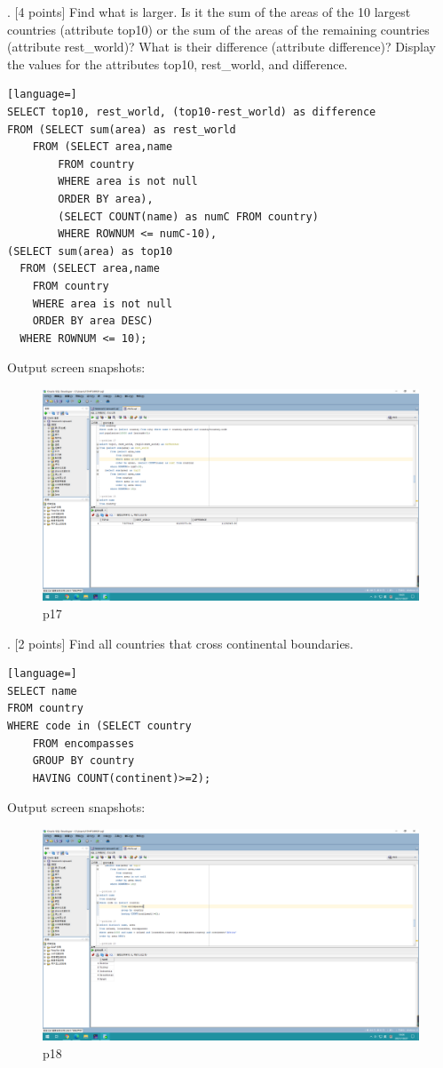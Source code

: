\documentclass[]{article}
\begin{document}
	. [4 points] Find what is larger. Is it the sum of the areas of the 10 largest countries (attribute top10) or the sum of the areas of the remaining countries (attribute rest\_world)? What is their difference (attribute difference)? Display the values for the attributes top10, rest\_world, and difference.    \\
	
	\begin{lstlisting}[language=] 
SELECT top10, rest_world, (top10-rest_world) as difference
FROM (SELECT sum(area) as rest_world
	FROM (SELECT area,name 
		FROM country
		WHERE area is not null
		ORDER BY area), 
	    (SELECT COUNT(name) as numC FROM country)
        WHERE ROWNUM <= numC-10),
(SELECT sum(area) as top10
  FROM (SELECT area,name 
	FROM country
	WHERE area is not null
	ORDER BY area DESC)
  WHERE ROWNUM <= 10);
	\end{lstlisting} 
	Output screen snapshots:
	\begin{figure}[H]
		\centering
		\includegraphics[width=1\linewidth]{../screen/p17}
		\caption{p17}
		\label{fig:p17}
	\end{figure}
	
	. [2 points] Find all countries that cross continental boundaries.   \\
	
	\begin{lstlisting}[language=] 
SELECT name
FROM country
WHERE code in (SELECT country
	FROM encompasses
	GROUP BY country
	HAVING COUNT(continent)>=2);
	\end{lstlisting} 
	Output screen snapshots:
	\begin{figure}[H]
		\centering
		\includegraphics[width=0.9\linewidth]{../screen/p18}
		\caption{p18}
		\label{fig:p18}
	\end{figure}
	
\end{document}
